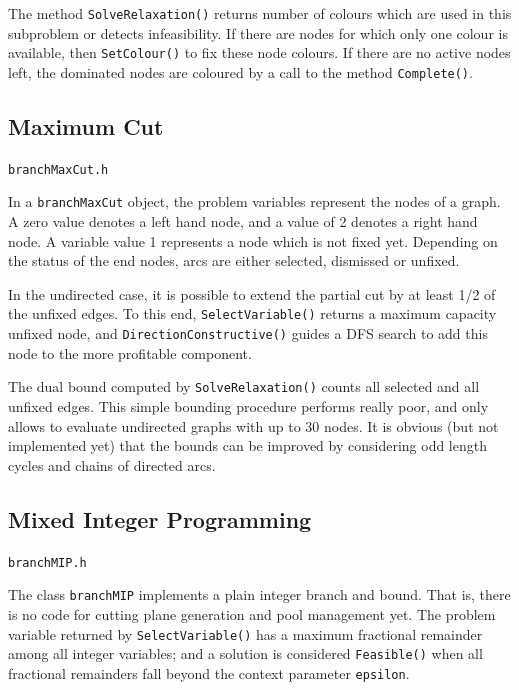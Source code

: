 \documentclass[a4paper,11pt,twoside]{book}
\begin{document}
\begin{multicols}{2}
The method \verb/SolveRelaxation()/ returns number of colours which are used
in this subproblem or detects infeasibility. If there are nodes for which
only one colour is available, then \verb/SetColour()/ to fix these node colours.
If there are no active nodes left, the dominated nodes are coloured by a call
to the method \verb/Complete()/.


\subsection{Maximum Cut}
\label{slb_branchMaxCut}
\myinclude\verb/branchMaxCut.h/

\noindent
In a \verb/branchMaxCut/ object, the problem variables represent the nodes of
a graph. A zero value denotes a left hand node, and a value of 2 denotes a right
hand node. A variable value 1 represents a node which is not fixed yet.
Depending on the status of the end nodes, arcs are either selected, dismissed
or unfixed.

In the undirected case, it is possible to extend the partial cut by at least
1/2 of the unfixed edges. To this end, \verb/SelectVariable()/ returns a
maximum capacity unfixed node, and \verb/DirectionConstructive()/ guides a DFS
search to add this node to the more profitable component.

The dual bound computed by \verb/SolveRelaxation()/ counts all selected and all
unfixed edges. This simple bounding procedure performs really poor, and only
allows to evaluate undirected graphs with up to 30 nodes. It is obvious (but not
implemented yet) that the bounds can be improved by considering odd length
cycles and chains of directed arcs.


\subsection{Mixed Integer Programming}
\label{slb_branchMIP}
\myinclude\verb/branchMIP.h/

\noindent
The class \verb/branchMIP/ implements a plain integer branch and bound. That is,
there is no code for cutting plane generation and pool management yet. The
problem variable returned by \verb/SelectVariable()/ has a maximum fractional
remainder among all integer variables; and a solution is considered
\verb/Feasible()/ when all fractional remainders fall beyond the context
parameter \verb/epsilon/.



\end{multicols}
\end{document}
